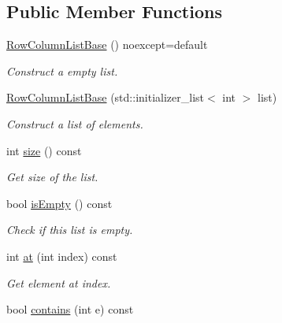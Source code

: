 \subsection*{Public Member Functions}
\begin{DoxyCompactItemize}
\item 
\hyperlink{class_mdt_1_1_item_model_1_1_row_column_list_base_afd267c9bc025a86780b2e5077e906669}{Row\+Column\+List\+Base} () noexcept=default\hypertarget{class_mdt_1_1_item_model_1_1_row_column_list_base_afd267c9bc025a86780b2e5077e906669}{}\label{class_mdt_1_1_item_model_1_1_row_column_list_base_afd267c9bc025a86780b2e5077e906669}

\begin{DoxyCompactList}\small\item\em Construct a empty list. \end{DoxyCompactList}\item 
\hyperlink{class_mdt_1_1_item_model_1_1_row_column_list_base_a66e0009dde912bc7d7649313002a0875}{Row\+Column\+List\+Base} (std\+::initializer\+\_\+list$<$ int $>$ list)
\begin{DoxyCompactList}\small\item\em Construct a list of elements. \end{DoxyCompactList}\item 
int \hyperlink{class_mdt_1_1_item_model_1_1_row_column_list_base_a3d44b64f2b4d508f716b9dc2b928ba90}{size} () const \hypertarget{class_mdt_1_1_item_model_1_1_row_column_list_base_a3d44b64f2b4d508f716b9dc2b928ba90}{}\label{class_mdt_1_1_item_model_1_1_row_column_list_base_a3d44b64f2b4d508f716b9dc2b928ba90}

\begin{DoxyCompactList}\small\item\em Get size of the list. \end{DoxyCompactList}\item 
bool \hyperlink{class_mdt_1_1_item_model_1_1_row_column_list_base_a8de0548d924ab48d849bdd0fd1439519}{is\+Empty} () const \hypertarget{class_mdt_1_1_item_model_1_1_row_column_list_base_a8de0548d924ab48d849bdd0fd1439519}{}\label{class_mdt_1_1_item_model_1_1_row_column_list_base_a8de0548d924ab48d849bdd0fd1439519}

\begin{DoxyCompactList}\small\item\em Check if this list is empty. \end{DoxyCompactList}\item 
int \hyperlink{class_mdt_1_1_item_model_1_1_row_column_list_base_a42c297e8e33172fd0e3c4d7b0e5cfacf}{at} (int index) const 
\begin{DoxyCompactList}\small\item\em Get element at index. \end{DoxyCompactList}\item 
bool \hyperlink{class_mdt_1_1_item_model_1_1_row_column_list_base_a4f43dc5fbe76b1274542dbf5715bd193}{contains} (int e) const \hypertarget{class_mdt_1_1_item_model_1_1_row_column_list_base_a4f43dc5fbe76b1274542dbf5715bd193}{}\label{class_mdt_1_1_item_model_1_1_row_column_list_base_a4f43dc5fbe76b1274542dbf5715bd193}


\end{DoxyCompactItemize}
